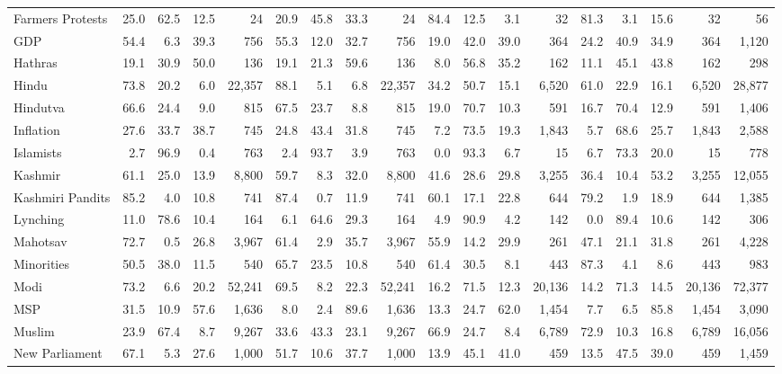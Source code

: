 \begin{table}[htbp]
\begin{adjustbox}{max width=\textwidth}
\begin{tabular}{lrrrrrrrrrrrrrrrrr}
Farmers Protests & 25.0 & 62.5 & 12.5 & 24 & 20.9 & 45.8 & 33.3 & 24 & 84.4 & 12.5 & 3.1 & 32 & 81.3 & 3.1 & 15.6 & 32 & 56 \\
GDP & 54.4 & 6.3 & 39.3 & 756 & 55.3 & 12.0 & 32.7 & 756 & 19.0 & 42.0 & 39.0 & 364 & 24.2 & 40.9 & 34.9 & 364 & 1,120 \\
Hathras & 19.1 & 30.9 & 50.0 & 136 & 19.1 & 21.3 & 59.6 & 136 & 8.0 & 56.8 & 35.2 & 162 & 11.1 & 45.1 & 43.8 & 162 & 298 \\
Hindu & 73.8 & 20.2 & 6.0 & 22,357 & 88.1 & 5.1 & 6.8 & 22,357 & 34.2 & 50.7 & 15.1 & 6,520 & 61.0 & 22.9 & 16.1 & 6,520 & 28,877 \\
Hindutva & 66.6 & 24.4 & 9.0 & 815 & 67.5 & 23.7 & 8.8 & 815 & 19.0 & 70.7 & 10.3 & 591 & 16.7 & 70.4 & 12.9 & 591 & 1,406 \\
Inflation & 27.6 & 33.7 & 38.7 & 745 & 24.8 & 43.4 & 31.8 & 745 & 7.2 & 73.5 & 19.3 & 1,843 & 5.7 & 68.6 & 25.7 & 1,843 & 2,588 \\
Islamists & 2.7 & 96.9 & 0.4 & 763 & 2.4 & 93.7 & 3.9 & 763 & 0.0 & 93.3 & 6.7 & 15 & 6.7 & 73.3 & 20.0 & 15 & 778 \\
Kashmir & 61.1 & 25.0 & 13.9 & 8,800 & 59.7 & 8.3 & 32.0 & 8,800 & 41.6 & 28.6 & 29.8 & 3,255 & 36.4 & 10.4 & 53.2 & 3,255 & 12,055 \\
Kashmiri Pandits & 85.2 & 4.0 & 10.8 & 741 & 87.4 & 0.7 & 11.9 & 741 & 60.1 & 17.1 & 22.8 & 644 & 79.2 & 1.9 & 18.9 & 644 & 1,385 \\
Lynching & 11.0 & 78.6 & 10.4 & 164 & 6.1 & 64.6 & 29.3 & 164 & 4.9 & 90.9 & 4.2 & 142 & 0.0 & 89.4 & 10.6 & 142 & 306 \\
Mahotsav & 72.7 & 0.5 & 26.8 & 3,967 & 61.4 & 2.9 & 35.7 & 3,967 & 55.9 & 14.2 & 29.9 & 261 & 47.1 & 21.1 & 31.8 & 261 & 4,228 \\
Minorities & 50.5 & 38.0 & 11.5 & 540 & 65.7 & 23.5 & 10.8 & 540 & 61.4 & 30.5 & 8.1 & 443 & 87.3 & 4.1 & 8.6 & 443 & 983 \\
Modi & 73.2 & 6.6 & 20.2 & 52,241 & 69.5 & 8.2 & 22.3 & 52,241 & 16.2 & 71.5 & 12.3 & 20,136 & 14.2 & 71.3 & 14.5 & 20,136 & 72,377 \\
MSP & 31.5 & 10.9 & 57.6 & 1,636 & 8.0 & 2.4 & 89.6 & 1,636 & 13.3 & 24.7 & 62.0 & 1,454 & 7.7 & 6.5 & 85.8 & 1,454 & 3,090 \\
Muslim & 23.9 & 67.4 & 8.7 & 9,267 & 33.6 & 43.3 & 23.1 & 9,267 & 66.9 & 24.7 & 8.4 & 6,789 & 72.9 & 10.3 & 16.8 & 6,789 & 16,056 \\
New Parliament & 67.1 & 5.3 & 27.6 & 1,000 & 51.7 & 10.6 & 37.7 & 1,000 & 13.9 & 45.1 & 41.0 & 459 & 13.5 & 47.5 & 39.0 & 459 & 1,459 \\

\end{tabular}
\end{adjustbox}
\end{table}
